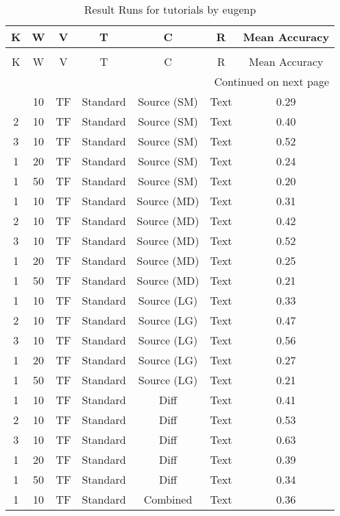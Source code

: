 \begin{longtable}{|c|c|c|c|c|c|c|}
\hline
K & W & V & T & C & R & Mean Accuracy \\
\hline
\endfirsthead
\caption[]{Continued from previous page} \\
\hline
K & W & V & T & C & R & Mean Accuracy \\
\hline
\endhead
\hline
\multicolumn{7}{r}{Continued on next page} \\
\endfoot
\hline
\caption{Result Runs for tutorials by eugenp} 
\label{result-runs-tutorials-eugenp}
\endlastfoot
1 & 10 & TF & Standard & Source (SM) & Text & 0.29 \\
\hline
2 & 10 & TF & Standard & Source (SM) & Text & 0.40 \\
\hline
3 & 10 & TF & Standard & Source (SM) & Text & 0.52 \\
\hline
1 & 20 & TF & Standard & Source (SM) & Text & 0.24 \\
\hline
1 & 50 & TF & Standard & Source (SM) & Text & 0.20 \\
\hline
1 & 10 & TF & Standard & Source (MD) & Text & 0.31 \\
\hline
2 & 10 & TF & Standard & Source (MD) & Text & 0.42 \\
\hline
3 & 10 & TF & Standard & Source (MD) & Text & 0.52 \\
\hline
1 & 20 & TF & Standard & Source (MD) & Text & 0.25 \\
\hline
1 & 50 & TF & Standard & Source (MD) & Text & 0.21 \\
\hline
1 & 10 & TF & Standard & Source (LG) & Text & 0.33 \\
\hline
2 & 10 & TF & Standard & Source (LG) & Text & 0.47 \\
\hline
3 & 10 & TF & Standard & Source (LG) & Text & 0.56 \\
\hline
1 & 20 & TF & Standard & Source (LG) & Text & 0.27 \\
\hline
1 & 50 & TF & Standard & Source (LG) & Text & 0.21 \\
\hline
1 & 10 & TF & Standard & Diff & Text & 0.41 \\
\hline
2 & 10 & TF & Standard & Diff & Text & 0.53 \\
\hline
3 & 10 & TF & Standard & Diff & Text & 0.63 \\
\hline
1 & 20 & TF & Standard & Diff & Text & 0.39 \\
\hline
1 & 50 & TF & Standard & Diff & Text & 0.34 \\
\hline
1 & 10 & TF & Standard & Combined & Text & 0.36 \\

\end{longtable}
